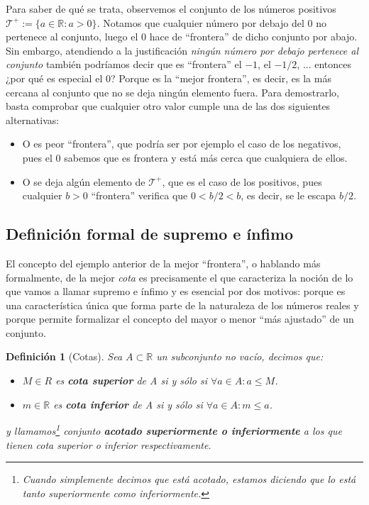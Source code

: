 \documentclass[10pt,a4paper,openright]{book}
\theoremstyle{break}
\newtheorem{defi}{Definición}[chapter]
\begin{document}
Para saber de qué se trata, observemos el conjunto de los números positivos $\mathcal T^+ := \{a\in \mathbb{R} : a > 0\}$. Notamos que cualquier número por debajo del $0$ no pertenece al conjunto, luego el $0$ hace de ``frontera'' de dicho conjunto por abajo. Sin embargo, atendiendo a la justificación \textit{ningún número por debajo pertenece al conjunto} también podríamos decir que es ``frontera'' el $-1$, el $-1/2$, ... entonces ¿por qué es especial el $0$? Porque es la ``mejor frontera'', es decir, es la más cercana al conjunto que no se deja ningún elemento fuera. Para demostrarlo, basta comprobar que cualquier otro valor cumple una de las dos siguientes alternativas:
\begin{itemize}
\item O es peor ``frontera'', que podría ser por ejemplo el caso de los negativos, pues el $0$ sabemos que es frontera y está más cerca que cualquiera de ellos.
\item O se deja algún elemento de $\mathcal{T}^+$, que es el caso de los positivos, pues cualquier $b>0$ ``frontera'' verifica que $0< b/2 < b$, es decir, se le escapa $b/2$.
\end{itemize}

\subsection{Definición formal de supremo e ínfimo}
El concepto del ejemplo anterior de la mejor ``frontera'', o hablando más formalmente, de la mejor \textit{cota} es precisamente el que caracteriza la noción de lo que vamos a llamar supremo e ínfimo y es esencial por dos motivos: porque es una característica única que forma parte de la naturaleza de los números reales y porque permite formalizar el concepto del mayor o menor ``más ajustado'' de un conjunto.

\begin{defi}[Cotas]
Sea $A\subset \mathbb R$ un subconjunto no vacío, decimos que:
\begin{itemize}
\item $M\in R$ es \textbf{cota superior} de A si y sólo si $\forall a\in A: a\leq M$.
\item $m\in \mathbb R$ es \textbf{cota inferior} de A si y sólo si $\forall a\in A: m\leq a$.
\end{itemize}
y llamamos\footnote{Cuando simplemente decimos que está acotado, estamos diciendo que lo está tanto superiormente como inferiormente.} conjunto \textbf{acotado superiormente o inferiormente} a los que tienen cota superior o inferior respectivamente.
\end{defi}
\end{document}
